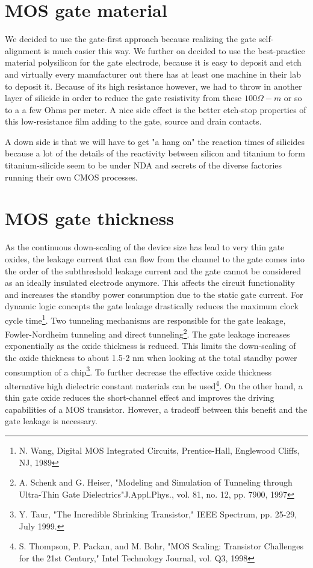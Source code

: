 \section{MOS gate material}
We decided to use the gate-first approach because realizing the gate self-alignment is much easier this way.
We further on decided to use the best-practice material polysilicon for the gate electrode, because it is easy to deposit and etch and virtually every manufacturer out there has at least one machine in their lab to deposit it.
Because of its high resistance however, we had to throw in another layer of silicide in order to reduce the gate resistivity from these $100 \Omega-m$ or so to a a few Ohms per meter.
A nice side effect is the better etch-stop properties of this low-resistance film adding to the gate, source and drain contacts.

A down side is that we will have to get "a hang on" the reaction times of silicides because a lot of the details of the reactivity between silicon and titanium to form titanium-silicide seem to be under NDA and secrets of the diverse factories running their own CMOS processes.

\section{MOS gate thickness}\label{gate_dimensioning}
As the continuous down-scaling of the device size has lead to very thin gate oxides, the leakage current that can flow from the channel to the gate comes into the order of the subthreshold leakage current and the gate cannot be considered as an ideally insulated electrode anymore.
This affects the circuit functionality and increases the standby power consumption due to the static gate current.
For dynamic logic concepts the gate leakage drastically reduces the maximum clock cycle time\footnote{N. Wang, Digital MOS Integrated Circuits, Prentice-Hall, Englewood Cliffs, NJ, 1989}.
Two tunneling mechanisms are responsible for the gate leakage, Fowler-Nordheim tunneling and direct tunneling\footnote{A. Schenk and G. Heiser, "Modeling and Simulation of Tunneling through Ultra-Thin Gate Dielectrics"J.Appl.Phys., vol. 81, no. 12, pp. 7900, 1997}.
The gate leakage increases exponentially as the oxide thickness is reduced.
This limits the down-scaling of the oxide thickness to about 1.5-2 nm when looking at the total standby power consumption of a chip\footnote{Y. Taur, "The Incredible Shrinking Transistor," IEEE Spectrum, pp. 25-29, July 1999.}.
To further decrease the effective oxide thickness alternative high dielectric constant materials can be used\footnote{S. Thompson, P. Packan, and M. Bohr, "MOS Scaling: Transistor Challenges for the 21st Century," Intel Technology Journal, vol. Q3, 1998}.
On the other hand, a thin gate oxide reduces the short-channel effect and improves the driving capabilities of a MOS transistor.
However, a tradeoff between this benefit and the gate leakage is necessary.\\

